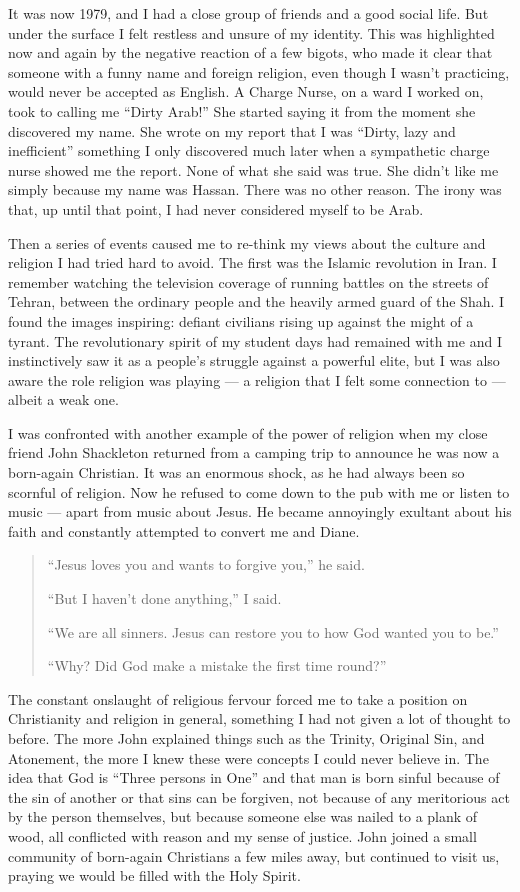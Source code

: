 \documentclass[12pt]{memoir}
\begin{document}
It was now 1979, and I had a close group of friends and a good social life.
But under the surface I felt restless and unsure of my identity.
This was highlighted now and again by the negative reaction of a few bigots,
who made it clear that someone with a funny name and foreign religion,
even though I wasn’t practicing, would never be accepted as English.
A Charge Nurse, on a ward I worked on, took to calling me “Dirty Arab!”
She started saying it from the moment she discovered my name.
She wrote on my report that I was “Dirty, lazy and inefficient”
something I only discovered much later
when a sympathetic charge nurse showed me the report.
None of what she said was true.
She didn’t like me simply because my name was Hassan.
There was no other reason.
The irony was that, up until that point,
I had never considered myself to be Arab.

Then a series of events caused me to re-think my views
about the culture and religion I had tried hard to avoid.
The first was the Islamic revolution in Iran.
I remember watching the television coverage of running battles
on the streets of Tehran, between the ordinary people
and the heavily armed guard of the Shah.
I found the images inspiring:
defiant civilians rising up against the might of a tyrant.
The revolutionary spirit of my student days had remained with me
and I instinctively saw it as a people’s struggle against a powerful elite,
but I was also aware the role religion was playing —
a religion that I felt some connection to — albeit a weak one.

I was confronted with another example of the power of religion
when my close friend John Shackleton returned from a camping trip
to announce he was now a born-again Christian.
It was an enormous shock, as he had always been so scornful of religion.
Now he refused to come down to the pub with me or listen to music —
apart from music about Jesus.
He became annoyingly exultant about his faith
and constantly attempted to convert me and Diane.

\begin{quote}
“Jesus loves you and wants to forgive you,” he said.

“But I haven’t done anything,” I said.

“We are all sinners. Jesus can restore you to how God wanted you to be.”

“Why? Did God make a mistake the first time round?”
\end{quote}

The constant onslaught of religious fervour forced me
to take a position on Christianity and religion in general,
something I had not given a lot of thought to before.
The more John explained things such as the Trinity, Original Sin,
and Atonement, the more I knew these were concepts I could never believe in.
The idea that God is “Three persons in One” and that man is born sinful
because of the sin of another or that sins can be forgiven,
not because of any meritorious act by the person themselves,
but because someone else was nailed to a plank of wood,
all conflicted with reason and my sense of justice.
John joined a small community of born-again Christians a few miles away,
but continued to visit us, praying we would be filled with the Holy Spirit.
\end{document}
